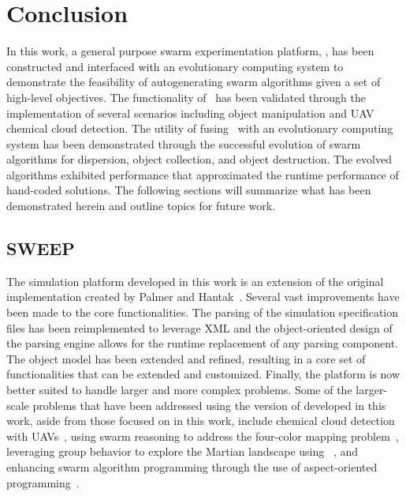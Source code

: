 \chapter{Conclusion}
\label{ch:Conclusion}

In this work, a general purpose swarm experimentation platform, \SWEEP{}, has been constructed and interfaced with an evolutionary computing system to demonstrate the feasibility of autogenerating swarm algorithms given a set of high-level objectives.  The functionality of \SWEEP{}\ has been validated through the implementation of several scenarios including object manipulation and UAV chemical cloud detection.  The utility of fusing \SWEEP{}\ with an evolutionary computing system has been demonstrated through the successful evolution of swarm algorithms for dispersion, object collection, and object destruction.  The evolved algorithms exhibited performance that approximated the runtime performance of hand-coded solutions.  The following sections will summarize what has been demonstrated herein and outline topics for future work.


\section{SWEEP}

The \SWEEP{} simulation platform developed in this work is an extension of the original \SWEEP{} implementation created by Palmer and Hantak~\cite{hantak:SWEEP}.  Several vast improvements have been made to the core \SWEEP{} functionalities.  The parsing of the simulation specification files has been reimplemented to leverage XML and the object-oriented design of the parsing engine allows for the runtime replacement of any parsing component.  The \SWEEP{} object model has been extended and refined, resulting in a core set of functionalities that can be extended and customized.  Finally, the \SWEEP{} platform is now better suited to handle larger and more complex problems.  Some of the larger-scale problems that have been addressed using the version of \SWEEP{} developed in this work, aside from those focused on in this work, include chemical cloud detection with UAVs~\cite{kovacina:AdaptiveIntelligentEvolution}, using swarm reasoning to address the four-color mapping problem~\cite{jshifflet:SwarmReasoning, dpalmer:SwarmReasoning}, leveraging group behavior to explore the Martian landscape using ~\cite{kolacinski:SwarmRovers}, and enhancing swarm algorithm programming through the use of aspect-oriented programming~\cite{pkovacina:AspectSwarms}.

